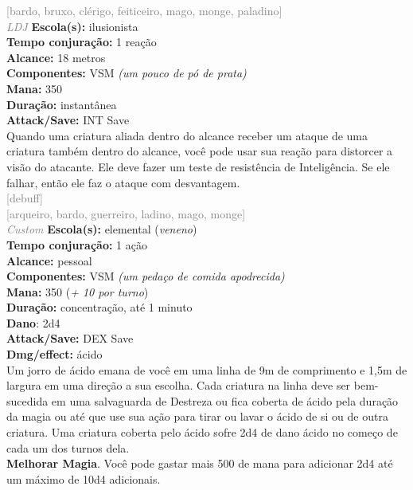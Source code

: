\documentclass{RPG_Adventure}[2021/10/20]
\begin{document}
{\scriptsize \textcolor{gray}{[bardo, bruxo, clérigo, feiticeiro, mago, monge, paladino]\\}}
{\tiny \textcolor{gray}{\textit{LDJ}}}
{\small \t \textbf{Escola(s):} ilusionista\\\t \textbf{Tempo conjuração:} 1 reação\\\t \textbf{Alcance:} 18 metros\\\t \textbf{Componentes:} VSM \textit{(um pouco de pó de prata)}\\\t \textbf{Mana:} 350\\\t \textbf{Duração:} instantânea\\\t \textbf{Attack/Save:} INT Save\\}
{\normalsize Quando uma criatura aliada dentro do alcance receber um ataque de uma criatura também dentro do alcance, você pode usar sua reação para distorcer a visão do atacante. Ele deve fazer um teste de resistência de Inteligência. Se ele falhar, então ele faz o ataque com desvantagem.\\}
{\scriptsize \textcolor{gray}{[debuff]\\}}
{\scriptsize \textcolor{gray}{[arqueiro, bardo, guerreiro, ladino, mago, monge]\\}}
{\tiny \textcolor{gray}{\textit{Custom}}}
{\small \t \textbf{Escola(s):} elemental (\textit{veneno})\\\t \textbf{Tempo conjuração:} 1 ação\\\t \textbf{Alcance:} pessoal\\\t \textbf{Componentes:} VSM \textit{(um pedaço de comida apodrecida)}\\\t \textbf{Mana:} 350 (\textit{+ 10 por turno})\\\t \textbf{Duração:} concentração, até 1 minuto\\\t \textbf{Dano}: 2d4\\\t \textbf{Attack/Save:} DEX Save\\\t \textbf{Dmg/effect:} ácido\\}
{\normalsize Um jorro de ácido emana de você em uma linha de 9m de comprimento e 1,5m de largura em uma direção a sua escolha. Cada criatura na linha deve ser bem-sucedida em uma salvaguarda de Destreza ou fica coberta de ácido pela duração da magia ou até que use sua ação para tirar ou lavar o ácido de si ou de outra criatura. Uma criatura coberta pelo ácido sofre 2d4 de dano ácido no começo de cada um dos turnos dela.\\\t \textbf{Melhorar Magia}. Você pode gastar mais 500 de mana para adicionar 2d4 até um máximo de 10d4 adicionais.\\}
\end{document}
